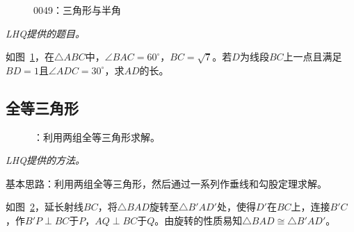 

\begin{figure}[htbp]
  \centering
  \caption{0049：三角形与半角} \label{fig:0049}
\end{figure}

\emph{LHQ提供的题目。}

如图~\ref{fig:0049}，在$\triangle ABC$中，$\angle BAC = 60^\circ$，$BC = \sqrt7$。若$D$为线段$BC$上一点且满足$BD = 1$且$\angle ADC = 30^\circ$，求$AD$的长。


\subsection{全等三角形} \label{subsec:0049-eqtri}

\begin{figure}[htbp]
  \centering
  \caption{：利用两组全等三角形求解。}
  \label{fig:0049-eqtri}
\end{figure}

\emph{LHQ提供的方法。}

基本思路：利用两组全等三角形，然后通过一系列作垂线和勾股定理求解。

如图~\ref{fig:0049-eqtri}，延长射线$BC$，将$\triangle BAD$旋转至$\triangle B'AD'$处，使得$D'$在$BC$上，连接$B'C$，作$B'P \perp BC$于$P$，$AQ \perp BC$于$Q$。由旋转的性质易知$\triangle BAD \cong \triangle B'AD'$。

